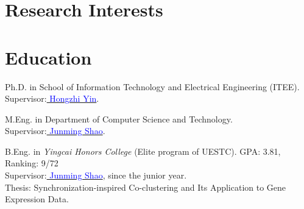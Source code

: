 \documentclass[11pt,legalpaper,sans]{moderncv1} %
\newcommand{\blue}[1]{{\textcolor{blue}{{} #1}}}
\begin{document}
\makecvtitle %


\vspace{-7mm}
\section{Research Interests}



\section{Education}

{Ph.D. in School of Information Technology and Electrical Engineering (ITEE).\vspace{1mm}\\
Supervisor:\href{https://sites.google.com/site/dbhongzhi/}{\blue{Hongzhi Yin}}.\\}

{M.Eng. in Department of Computer Science and Technology.\vspace{1mm}\\
Supervisor:\href{http://dm.uestc.edu.cn}{\blue{Junming Shao}}.\\}

{B.Eng. in \textit{Yingcai Honors College} (Elite program of UESTC). GPA: 3.81, Ranking: 9/72\\
Supervisor:\href{http://dm.uestc.edu.cn}{\blue{Junming Shao}}, since the junior year.\vspace{1mm}\\
Thesis: Synchronization-inspired Co-clustering and Its Application to Gene Expression Data.}  %

\end{document}
